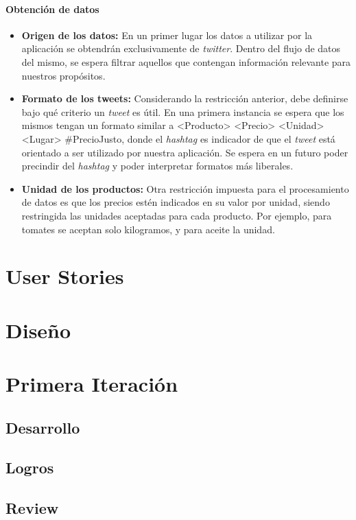 \documentclass[10pt, a4paper]{article}
\begin{document}
\paragraph{Obtención de datos}
\begin{itemize}
    \item \textbf{Origen de los datos:} En un primer lugar los datos a utilizar por la aplicación se obtendrán exclusivamente de \emph{twitter}. Dentro del flujo de datos del mismo, se espera filtrar aquellos que contengan información relevante para nuestros propósitos.
    \item \textbf{Formato de los tweets:} Considerando la restricción anterior, debe definirse bajo qué criterio un \emph{tweet} es útil. En una primera instancia se espera que los mismos tengan un formato similar a \textsf{<Producto> <Precio> <Unidad> <Lugar> \#PrecioJusto}, donde el \emph{hashtag} es indicador de que el \emph{tweet} está orientado a ser utilizado por nuestra aplicación. Se espera en un futuro poder precindir del \emph{hashtag} y poder interpretar formatos más liberales.
    \item \textbf{Unidad de los productos:} Otra restricción impuesta para el procesamiento de datos es que los precios estén indicados en su valor por unidad, siendo restringida las unidades aceptadas para cada producto. Por ejemplo, para tomates se aceptan solo kilogramos, y para aceite la unidad.
\end{itemize}

\section{User Stories}

\section{Diseño}

\section{Primera Iteración}

\subsection{Desarrollo}

\subsection{Logros}

\subsection{Review}
\end{document}

